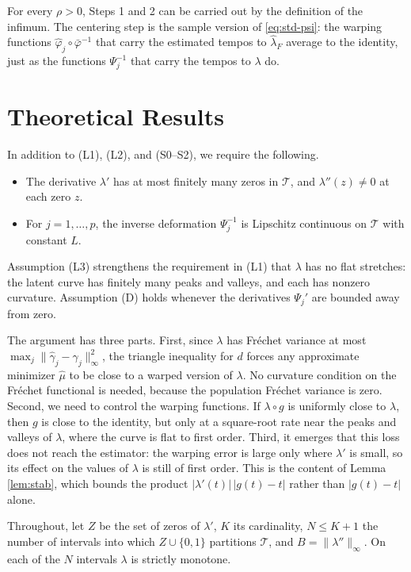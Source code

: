 \documentclass[11pt]{article}
\newcommand{\T}{\mathcal{T}}
\newcommand{\lhat}{\hat{\lambda}}
\newcommand{\ghat}{\hat{\gamma}}
\newcommand{\muhat}{\hat{\mu}}
\newcommand{\phihat}{\hat{\varphi}}
\newcommand{\norm}[1]{\|#1\|_\infty}
\begin{document}
For every $\rho > 0$, Steps 1 and 2 can be carried out by the definition of the infimum.
The centering step is the sample version of \eqref{eq:std-psi}: the warping functions
$\phihat_j \circ \bar{\varphi}^{-1}$ that carry the estimated tempos to $\lhat_F$ average
to the identity, just as the functions $\Psi_j^{-1}$ that carry the tempos to $\lambda$ do.

\section{Theoretical Results}
\label{sec:results}

In addition to (L1), (L2), and (S0--S2), we require the following.

\begin{itemize}
  \item[(L3)] The derivative $\lambda'$ has at most finitely many zeros in $\T$, and
    $\lambda''(z) \neq 0$ at each zero $z$.
  \item[(D)] For $j = 1,\ldots,p$, the inverse deformation $\Psi_j^{-1}$ is Lipschitz
    continuous on $\T$ with constant $L$.
\end{itemize}

Assumption (L3) strengthens the requirement in (L1) that $\lambda$ has no flat stretches: the
latent curve has finitely many peaks and valleys, and each has nonzero curvature. Assumption
(D) holds whenever the derivatives $\Psi_j'$ are bounded away from zero.

The argument has three parts. First, since $\lambda$ has Fr\'echet
variance at most $\max_j\norm{\ghat_j-\gamma_j}^2$, the triangle inequality for $d$ forces any
approximate minimizer $\muhat$ to be close to a warped version of $\lambda$. No curvature
condition on the Fr\'echet functional is needed, because the population Fr\'echet variance is
zero. Second, we need to control the warping functions. If $\lambda\circ g$ is uniformly
close to $\lambda$, then $g$ is close to the identity, but only at a square-root rate near the
peaks and valleys of $\lambda$, where the curve is flat to first order. Third, it emerges
that this loss does not reach the estimator: the warping error is large only where
$\lambda'$ is small, so its effect on the values of $\lambda$ is still of first order. This
is the content of Lemma \ref{lem:stab}, which bounds the product $|\lambda'(t)|\,|g(t)-t|$
rather than $|g(t)-t|$ alone.

Throughout, let $Z$ be the set of zeros of $\lambda'$, $K$ its cardinality,
$N \le K+1$ the number of intervals into which $Z \cup \{0,1\}$ partitions $\T$, and
$B = \norm{\lambda''}$. On each of the $N$ intervals $\lambda$ is strictly monotone.
\end{document}
